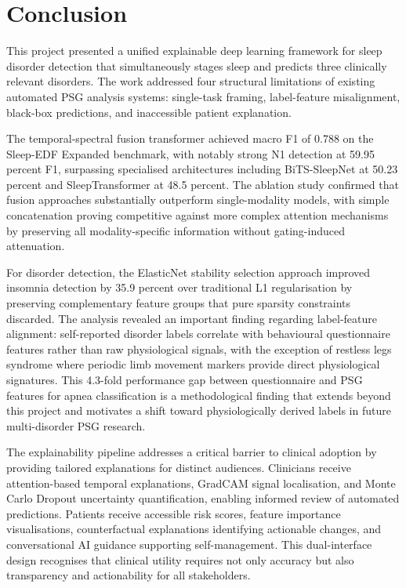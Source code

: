 
\section{Conclusion}

This project presented a unified explainable deep learning framework for sleep disorder detection that simultaneously stages sleep and predicts three clinically relevant disorders. The work addressed four structural limitations of existing automated PSG analysis systems: single-task framing, label-feature misalignment, black-box predictions, and inaccessible patient explanation.

The temporal-spectral fusion transformer achieved macro F1 of 0.788 on the Sleep-EDF Expanded benchmark, with notably strong N1 detection at 59.95 percent F1, surpassing specialised architectures including BiTS-SleepNet at 50.23 percent and SleepTransformer at 48.5 percent. The ablation study confirmed that fusion approaches substantially outperform single-modality models, with simple concatenation proving competitive against more complex attention mechanisms by preserving all modality-specific information without gating-induced attenuation.

For disorder detection, the ElasticNet stability selection approach improved insomnia detection by 35.9 percent over traditional L1 regularisation by preserving complementary feature groups that pure sparsity constraints discarded. The analysis revealed an important finding regarding label-feature alignment: self-reported disorder labels correlate with behavioural questionnaire features rather than raw physiological signals, with the exception of restless legs syndrome where periodic limb movement markers provide direct physiological signatures. This 4.3-fold performance gap between questionnaire and PSG features for apnea classification is a methodological finding that extends beyond this project and motivates a shift toward physiologically derived labels in future multi-disorder PSG research.

The explainability pipeline addresses a critical barrier to clinical adoption by providing tailored explanations for distinct audiences. Clinicians receive attention-based temporal explanations, GradCAM signal localisation, and Monte Carlo Dropout uncertainty quantification, enabling informed review of automated predictions. Patients receive accessible risk scores, feature importance visualisations, counterfactual explanations identifying actionable changes, and conversational AI guidance supporting self-management. This dual-interface design recognises that clinical utility requires not only accuracy but also transparency and actionability for all stakeholders.

